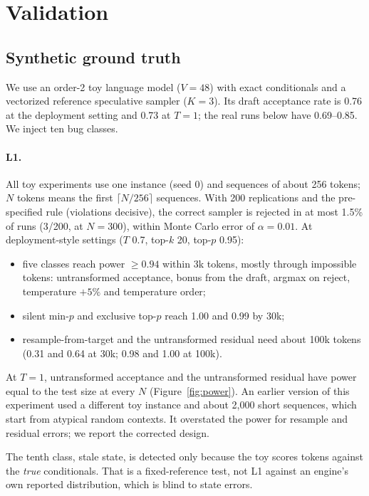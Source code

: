 \documentclass[10pt]{article}
\theoremstyle{remark}
\begin{document}
\section{Validation}
\subsection{Synthetic ground truth}\label{sec:toy}
We use an order-2 toy language model ($V{=}48$) with exact conditionals and a vectorized reference speculative sampler ($K{=}3$). Its draft acceptance rate is 0.76 at the deployment setting and 0.73 at $T{=}1$; the real runs below have 0.69--0.85. We inject ten bug classes.

\paragraph{L1.} All toy experiments use one instance (seed 0) and sequences of about 256 tokens; $N$ tokens means the first $\lceil N/256\rceil$ sequences. With 200 replications and the pre-specified rule (violations decisive), the correct sampler is rejected in at most 1.5\% of runs (3/200, at $N=300$), within Monte Carlo error of $\alpha=0.01$. At deployment-style settings ($T$ 0.7, top-$k$ 20, top-$p$ 0.95):
\begin{itemize}
\item five classes reach power $\ge0.94$ within 3k tokens, mostly through impossible tokens: untransformed acceptance, bonus from the draft, argmax on reject, temperature $+5\%$ and temperature order;
\item silent min-$p$ and exclusive top-$p$ reach 1.00 and 0.99 by 30k;
\item resample-from-target and the untransformed residual need about 100k tokens (0.31 and 0.64 at 30k; 0.98 and 1.00 at 100k).
\end{itemize}
At $T{=}1$, untransformed acceptance and the untransformed residual have power equal to the test size at every $N$ (Figure~\ref{fig:power}). An earlier version of this experiment used a different toy instance and about 2,000 short sequences, which start from atypical random contexts. It overstated the power for resample and residual errors; we report the corrected design.

The tenth class, stale state, is detected only because the toy scores tokens against the \emph{true} conditionals. That is a fixed-reference test, not L1 against an engine's own reported distribution, which is blind to state errors.
\end{document}
